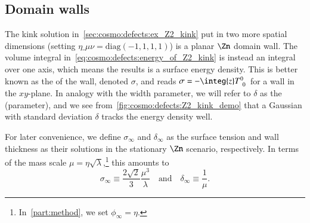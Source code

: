 \subsection{Domain walls}\label{sec:cosmo:defects:dws}
    The kink solution in~\cref{sec:cosmo:defects:ex_Z2_kink} put in two more spatial dimensions (setting $\eta\_{\mu\nu}=\text{diag}(-1,1,1,1)$) is a planar $\Zn$ domain wall. 
    The volume integral in~\cref{eq:cosmo:defects:energy_of_Z2_kink} is instead an integral over one axis, which means the results is a surface energy density. This is better known as the  of the wall, denoted $\sigma$, and reads $\sigma = -\integ{z} T\indices{^0_0}$ for a wall in the $xy$-plane. %
    In analogy with the width parameter, we will refer to $\delta$ as the  (parameter), and we see from~\cref{fig:cosmo:defects:Z2_kink_demo} that a Gaussian with standard deviation $\delta$ tracks the energy density well.
    
    For later convenience, we define $\sigma_\infty$ and $\delta_\infty$ as the surface tension and wall thickness as their solutions in the stationary $\Zn$ scenario, respectively. In terms of the mass scale $\mu=\eta\sqrt{\lambda}$,\footnote{In~\cref{part:method}, we set $\phi_\infty = \eta$.} this amounts to
    \begin{equation}\label{eq:cosmo:defects:sigma_delta_inf}
        \sigma_\infty \equiv \frac{2\sqrt{2 }}{3} \frac{\mu^3}{\lambda} \quad\text{and}\quad \delta_\infty \equiv \frac{1}{\mu}.
    \end{equation}
    

